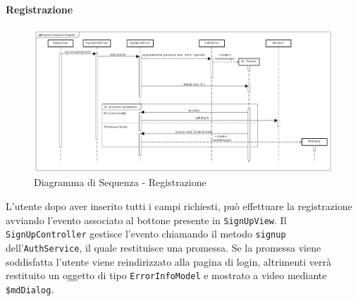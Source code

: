\paragraph{Registrazione}

\label{Diagramma di Sequenza - Registrazione}

\begin{figure}[ht]
	\centering
	\includegraphics[scale=0.4,keepaspectratio]{UML/DiagrammiDiSequenza/Front-end/SignUp.png}
	\caption{Diagramma di Sequenza - Registrazione}
\end{figure} \FloatBarrier

L'utente dopo aver inserito tutti i campi richiesti, può effettuare la registrazione avviando l'evento associato al bottone presente in \texttt{SignUpView}. Il \texttt{SignUpController} gestisce l'evento chiamando il metodo \texttt{signup} dell'\texttt{AuthService}, il quale restituisce una promessa. Se la promessa viene soddisfatta l'utente viene reindirizzato alla pagina di login, altrimenti verrà restituito un oggetto di tipo \texttt{ErrorInfoModel} e mostrato a video mediante \texttt{\$mdDialog}.